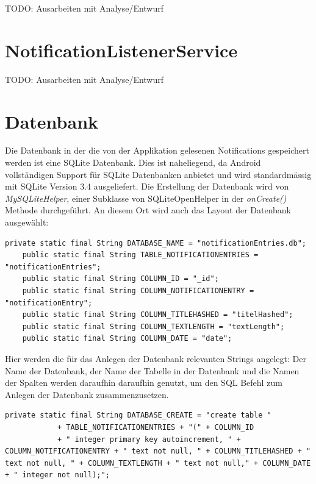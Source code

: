 TODO: Ausarbeiten mit Analyse/Entwurf

\section{NotificationListenerService}

TODO: Ausarbeiten mit Analyse/Entwurf


\section{Datenbank}

Die Datenbank in der die von der Applikation gelesenen Notifications gespeichert werden ist eine SQLite Datenbank.
Dies ist naheliegend, da Android vollständigen Support für SQLite Datenbanken anbietet und wird standardmässig mit SQLite Version 3.4 ausgeliefert.
Die Erstellung der Datenbank wird von \emph{MySQLiteHelper}, einer Subklasse von SQLiteOpenHelper in der \emph{onCreate()} Methode durchgeführt.
An diesem Ort wird auch das Layout der Datenbank ausgewählt:

\begin{lstlisting}[frame=single, caption = Datenbank Strings, label=databasestrings] 
    private static final String DATABASE_NAME = "notificationEntries.db";
    public static final String TABLE_NOTIFICATIONENTRIES = "notificationEntries"; 
    public static final String COLUMN_ID = "_id";
    public static final String COLUMN_NOTIFICATIONENTRY = "notificationEntry";
    public static final String COLUMN_TITLEHASHED = "titelHashed";
    public static final String COLUMN_TEXTLENGTH = "textLength";
    public static final String COLUMN_DATE = "date";
\end{lstlisting}

Hier werden die für das Anlegen der Datenbank relevanten Strings angelegt:
Der Name der Datenbank, der Name der Tabelle in der Datenbank und die Namen der Spalten werden daraufhin daraufhin genutzt, um den SQL Befehl zum Anlegen der Datenbank zusammenzusetzen.

\begin{lstlisting}[frame=single, caption = Datenbank Creation String, label=databasecreation] 
    private static final String DATABASE_CREATE = "create table "
            + TABLE_NOTIFICATIONENTRIES + "(" + COLUMN_ID
            + " integer primary key autoincrement, " + COLUMN_NOTIFICATIONENTRY + " text not null, " + COLUMN_TITLEHASHED + " text not null, " + COLUMN_TEXTLENGTH + " text not null," + COLUMN_DATE + " integer not null);";

\end{lstlisting}

